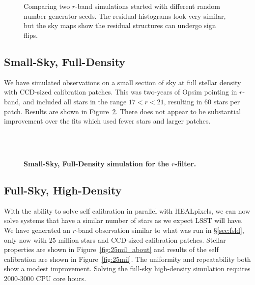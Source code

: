 \documentclass[12pt,preprint]{aastex}
\begin{document}
\begin{figure}
 \\
 \\
\caption{Comparing two $r$-band simulations started with different random number generator seeds.  The residual histograms look very similar, but the sky maps show the residual structures can undergo sign flips. \label{fig:diffseed} }
\end{figure}


\subsection{Small-Sky, Full-Density}
We have simulated observations on a small section of sky at full stellar density with CCD-sized calibration patches.  This was two-years of Opsim pointing in $r$-band, and included all stars in the range $17 < r < 21 $, resulting in 60 stars per patch.  Results are shown in Figure~\ref{fig:r1e6hd}.  There does not appear to be substantial improvement over the fits which used fewer stars and larger patches.

\begin{figure}
 \\
 \\
\caption{ {\bf Small-Sky, Full-Density simulation for the $r$-filter.}  \label{fig:r1e6hd}}
\end{figure}

\subsection{Full-Sky, High-Density}

With the ability to solve self calibration in parallel with HEALpixels, we can now solve systems that have a similar number of stars as we expect LSST will have.  We have generated an $r$-band observation similar to what was run in \S\ref{sec:fsld}, only now with 25 million stars and CCD-sized calibration patches.  Stellar properties are shown in Figure~\ref{fig:25mil_about} and results of the self calibration are shown in Figure~\ref{fig:25mil}.  The uniformity and repeatability both show a modest improvement.  Solving the full-sky high-density simulation requires 2000-3000 CPU core hours.  
\end{document}

